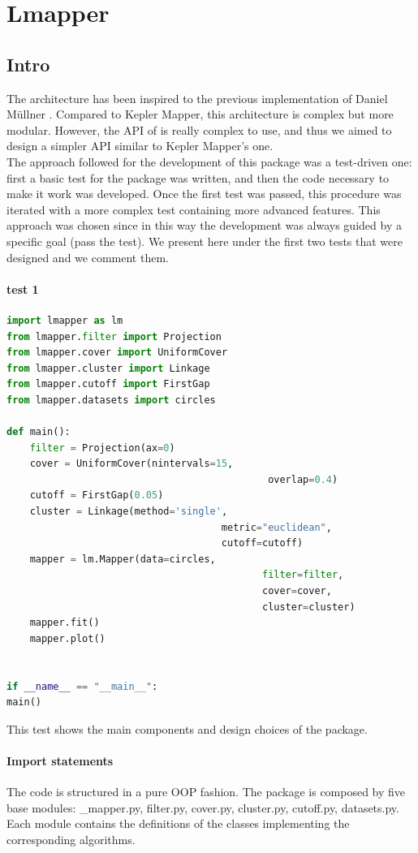 \section{Lmapper}
\subsection{Intro}
The architecture has been inspired to the previous implementation of Daniel M\"ullner \cite{pythonmapper}. Compared to Kepler Mapper, this architecture is complex but more modular. However, the API of \cite{pythonmapper} is really complex to use, and thus we aimed to design a simpler API similar to Kepler Mapper's one.\\
The approach followed for the development of this package was a test-driven one: first a basic test for the package was written, and then the code necessary to make it work was developed. Once the first test was passed, this procedure was iterated with a more complex test containing more advanced features. This approach was chosen since in this way the development was always guided by a specific goal (pass the test).
We present here under the first two tests that were designed and we comment them.

\paragraph{test 1}
\begin{lstlisting}[language=Python, caption=First test for Mapper]
import lmapper as lm
from lmapper.filter import Projection
from lmapper.cover import UniformCover
from lmapper.cluster import Linkage
from lmapper.cutoff import FirstGap
from lmapper.datasets import circles

def main():
	filter = Projection(ax=0)
	cover = UniformCover(nintervals=15,
										     overlap=0.4)
	cutoff = FirstGap(0.05)
	cluster = Linkage(method='single',
									 metric="euclidean",
									 cutoff=cutoff)
	mapper = lm.Mapper(data=circles,
											filter=filter,
	 										cover=cover,
											cluster=cluster)
	mapper.fit()
	mapper.plot()


if __name__ == "__main__":
main()

\end{lstlisting}
This test shows the main components and design choices of the package. 
\paragraph{Import statements}
The code is structured in a pure OOP fashion. The package is composed by five base modules: \_mapper.py, filter.py, cover.py, cluster.py, cutoff.py, datasets.py.  Each module contains the definitions of the classes implementing the corresponding algorithms. 

